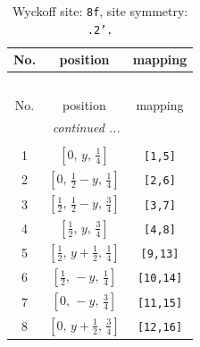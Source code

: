 \documentclass[fleqn,8pt]{jsarticle}
\begin{document}
\begin{longtable}{ccc}
\caption{Wyckoff site: {\tt 8f}, site symmetry: {\tt .2'.}}
 \\
 \hline \hline
No. & position & mapping \\ \hline \endfirsthead

\multicolumn{2}{l}{\tablename\ \thetable{}} \\
 \hline \hline
No. & position & mapping \\ \hline \endhead

 \hline \hline
\multicolumn{2}{r}{\footnotesize\it continued ...} \\ \endfoot

 \hline \hline
\multicolumn{2}{r}{} \\ \endlastfoot

1 & $\left[ 0,\, y,\, \frac{1}{4} \right]$ & {\tt [1,5]} \\ \hline
2 & $\left[ 0,\, \frac{1}{2} - y,\, \frac{1}{4} \right]$ & {\tt [2,6]} \\ \hline
3 & $\left[ \frac{1}{2},\, \frac{1}{2} - y,\, \frac{3}{4} \right]$ & {\tt [3,7]} \\ \hline
4 & $\left[ \frac{1}{2},\, y,\, \frac{3}{4} \right]$ & {\tt [4,8]} \\ \hline
5 & $\left[ \frac{1}{2},\, y + \frac{1}{2},\, \frac{1}{4} \right]$ & {\tt [9,13]} \\ \hline
6 & $\left[ \frac{1}{2},\, - y,\, \frac{1}{4} \right]$ & {\tt [10,14]} \\ \hline
7 & $\left[ 0,\, - y,\, \frac{3}{4} \right]$ & {\tt [11,15]} \\ \hline
8 & $\left[ 0,\, y + \frac{1}{2},\, \frac{3}{4} \right]$ & {\tt [12,16]} \\
\end{longtable}
\renewcommand{\arraystretch}{1.2}
\end{document}
